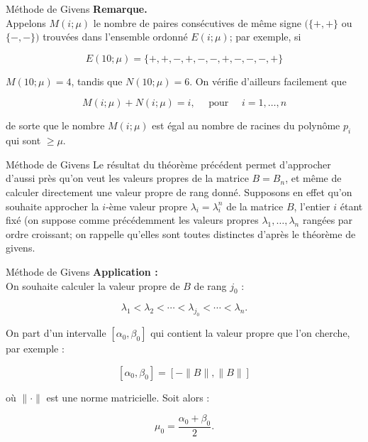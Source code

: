 \documentclass[french, 10pt]{beamer}
\theoremstyle{definition}
\begin{document}
\begin{frame}{Méthode de Givens}
	\textbf{Remarque.} \\Appelons $M(i ; \mu)$ le nombre de paires consécutives de même signe $(\{+,+\}$ ou $\{-,-\})$ trouvées dans l'ensemble ordonné $E(i ; \mu)$; par exemple, si
	
	$$
	E(10 ; \mu)=\{+,+,-,+,-,-,+,-,-,-,+\}
	$$
	
	$M(10 ; \mu)=4$, tandis que $N(10 ; \mu)=6$. On vérifie d'ailleurs facilement que
	
	$$
	M(i ; \mu)+N(i ; \mu)=i, \quad \text { pour } \quad i=1, \ldots, n
	$$
	
	de sorte que le nombre $M(i ; \mu)$ est égal au nombre de racines du polynôme $p_i$ qui sont $\geqslant \mu$.
\end{frame}
\begin{frame}{Méthode de Givens}
	Le résultat du théorème précédent permet d'approcher d'aussi près qu'on veut les valeurs propres de la matrice $B=B_n$, et même de calculer directement une valeur propre de rang donné. Supposons en effet qu'on souhaite approcher la $i$-ème valeur propre $\lambda_i=\lambda_i^n$ de la matrice $B$, l'entier $i$ étant fixé (on suppose comme précédemment les valeurs propres $\lambda_1, \ldots, \lambda_n$ rangées par ordre croissant; on rappelle qu'elles sont toutes distinctes d'après le théorème de givens.
\end{frame}
\begin{frame}{Méthode de Givens}
\textbf{Application :} \\
On souhaite calculer la valeur propre de \( B \) de rang \( j_0 \) :

\[
\lambda_1 < \lambda_2 < \cdots < \lambda_{j_0} < \cdots < \lambda_n.
\]

On part d’un intervalle \( [\alpha_0, \beta_0] \) qui contient la valeur propre que l’on cherche, par exemple :

\[
[\alpha_0, \beta_0] = [-\|B\|, \|B\|]
\]

où \( \| \cdot \| \) est une norme matricielle. Soit alors :

\[
\mu_0 = \frac{\alpha_0 + \beta_0}{2}.
\]


	
\end{frame}
\end{document}
